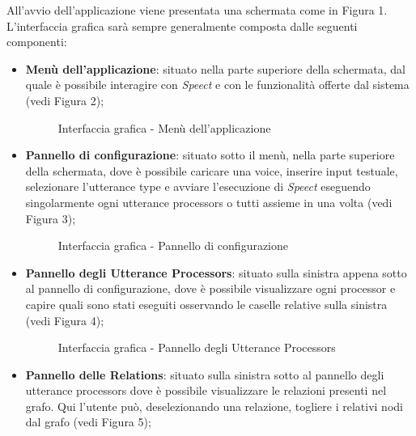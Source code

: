 \documentclass[openany,12pt,a4paper]{report}
\begin{document}
	All'avvio dell'applicazione viene presentata una schermata come in Figura 1.\\
 	L'interfaccia grafica sarà sempre generalmente composta dalle seguenti componenti:
 	\begin{itemize}
 		\item \textbf{Menù dell'applicazione}: situato nella parte superiore della schermata, dal quale è possibile interagire con \textit{Speect} e con le funzionalità offerte dal sistema (vedi Figura 2);
 		\begin{figure}[H]
 			
 			\centering
 			
 			
 			\caption{Interfaccia grafica - Menù dell'applicazione}
 			
 		\end{figure}
 	
 		\item \textbf{Pannello di configurazione}: situato sotto il menù, nella parte superiore della schermata, dove è possibile caricare una voice, inserire input testuale, selezionare l'utterance type e avviare l'esecuzione di \textit{Speect} eseguendo singolarmente ogni utterance processors o tutti assieme in una volta (vedi Figura 3);
 		\begin{figure}[H]
 			
 			\centering
 			
 			
 			\caption{Interfaccia grafica - Pannello di configurazione}
 			
 		\end{figure}
 	
 		\item \textbf{Pannello degli Utterance Processors}: situato sulla sinistra appena sotto al pannello di configurazione, dove è possibile visualizzare ogni processor e capire quali sono stati eseguiti osservando le caselle relative sulla sinistra (vedi Figura 4);
 		\begin{figure}[H]
 			
 			\centering
 			
 			
 			\caption{Interfaccia grafica - Pannello degli Utterance Processors}
 			
 		\end{figure}
 		
 		\item \textbf{Pannello delle Relations}: situato sulla sinistra sotto al pannello degli utterance processors dove è possibile visualizzare le relazioni presenti nel grafo. Qui l'utente può, deselezionando una relazione, togliere i relativi nodi dal grafo (vedi Figura 5);
 		\begin{figure}[H]
 			

\end{figure}
\end{itemize}
\end{document}
